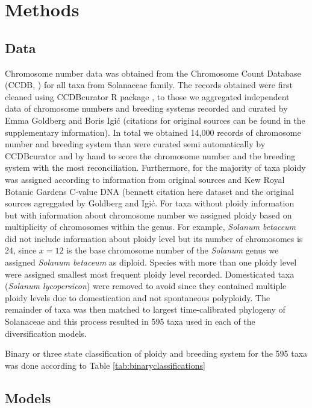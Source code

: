 \section{Methods}

\subsection{Data}

Chromosome number data was obtained from the Chromosome Count Database (CCDB, \citet{rice_2015}) for all taxa from Solanaceae family.
The records obtained were first cleaned using CCDBcurator R package \citep{zenilferguson_2017}, to those we aggregated independent data of chromosome numbers and breeding systems recorded and curated by Emma Goldberg and Boris Igi\'c  (citations for original sources can be found in the supplementary information).
In total we obtained 14,000 records of chromosome number and breeding system than were curated semi automatically by CCDBcurator and by hand to score the chromosome number and the breeding system with the most reconciliation.
Furthermore, for the majority of taxa ploidy was assigned according to information from original sources and Kew Royal Botanic Gardens C-value DNA (bennett citation here dataset and the original sources agreggated by Goldberg and Igi\'c.
For taxa without ploidy information but with information about chromosome number we assigned ploidy based on multiplicity of chromosomes within the genus.
For example, \textit{Solanum betaceum} did not include information about ploidy level but its number of chromosomes is 24, since $x=12$ is the base chromosome number of the \textit{Solanum} genus we assigned  \textit{Solanum betaceum} as diploid. 
Species with more than one ploidy level were assigned smallest most frequent ploidy level recorded.
Domesticated taxa (\ie \textit{Solanum lycopersicon}) were removed to avoid since they contained multiple ploidy levels due to domestication and not spontaneous polyploidy.
The remainder of taxa was then matched to largest time-calibrated phylogeny of Solanaceae and this process resulted in 595 taxa used in each of the diversification models.


Binary or three state classification of ploidy and breeding system for the 595 taxa  was done according to Table \autoref{tab:binaryclassifications}
  
\subsection{Models}

